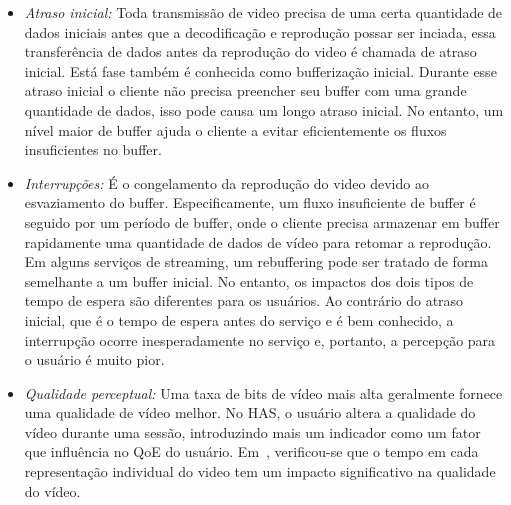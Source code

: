 
\begin{itemize}
\vspace{-0.05cm}
\item \textit{Atraso inicial:} Toda transmissão de video precisa de uma certa quantidade de dados iniciais antes que a decodificação e reprodução possar ser inciada, essa transferência de dados antes da reprodução do video é chamada de atraso inicial. Está fase também é conhecida como bufferização inicial. Durante esse atraso inicial o cliente não precisa preencher seu buffer com uma grande quantidade de dados, isso pode causa um longo atraso inicial. No entanto, um nível maior de buffer ajuda o cliente a evitar eficientemente os fluxos insuficientes no buffer.
\vspace{-0.05cm}
\item \textit{Interrupções:} É o congelamento da reprodução do video devido ao esvaziamento do buffer. Especificamente, um fluxo insuficiente de buffer é seguido por um período de buffer, onde o cliente precisa armazenar em buffer rapidamente uma quantidade de dados de vídeo para retomar a reprodução. 
Em alguns serviços de streaming, um rebuffering pode ser tratado de forma semelhante a um buffer inicial. No entanto, os impactos dos dois tipos de tempo de espera são diferentes para os usuários. Ao contrário do atraso inicial, que é o tempo de espera antes do serviço e é bem conhecido, a interrupção ocorre inesperadamente no serviço e, portanto, a percepção para o usuário é muito pior.%
\vspace{-0.05cm}
\item \textit{Qualidade perceptual:}
Uma taxa de bits de vídeo mais alta geralmente fornece uma qualidade de vídeo melhor. 
No HAS, o usuário altera a qualidade do vídeo durante uma sessão, introduzindo mais um indicador como um fator que influência no QoE do usuário. 
Em~\cite{HoBfeld2014QoMEX}, verificou-se que o tempo em cada representação individual do video tem um impacto significativo na qualidade do vídeo.

\end{itemize}
